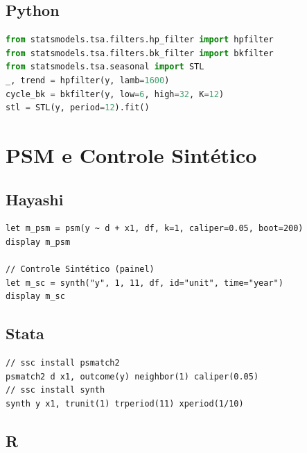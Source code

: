 \subsection*{Python}

\begin{lstlisting}[language=Python, basicstyle=\ttfamily\small,
  frame=single, numbers=none, backgroundcolor=\color{codbg},
  keywordstyle=\color{keyword}\bfseries,
  stringstyle=\color{string},
  commentstyle=\color{comment}\itshape]
from statsmodels.tsa.filters.hp_filter import hpfilter
from statsmodels.tsa.filters.bk_filter import bkfilter
from statsmodels.tsa.seasonal import STL
_, trend = hpfilter(y, lamb=1600)
cycle_bk = bkfilter(y, low=6, high=32, K=12)
stl = STL(y, period=12).fit()
\end{lstlisting}

\section{PSM e Controle Sintético}

\subsection*{Hayashi}

\begin{lstlisting}
let m_psm = psm(y ~ d + x1, df, k=1, caliper=0.05, boot=200)
display m_psm

// Controle Sintético (painel)
let m_sc = synth("y", 1, 11, df, id="unit", time="year")
display m_sc
\end{lstlisting}

\subsection*{Stata}

\begin{lstlisting}[language={}, basicstyle=\ttfamily\small,
  frame=single, numbers=none, backgroundcolor=\color{codbg}]
// ssc install psmatch2
psmatch2 d x1, outcome(y) neighbor(1) caliper(0.05)
// ssc install synth
synth y x1, trunit(1) trperiod(11) xperiod(1/10)
\end{lstlisting}

\subsection*{R}

